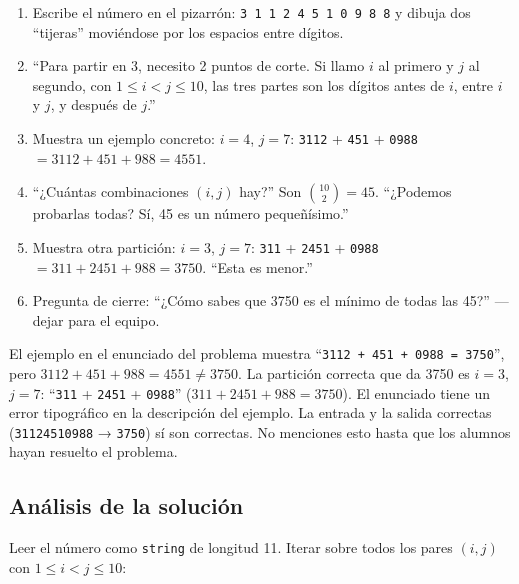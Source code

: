 \documentclass[12pt, oneside]{article}
\begin{document}
\begin{notaprofesor}
  \begin{enumerate}
    \item Escribe el número en el pizarrón:
          \texttt{3\,1\,1\,2\,4\,5\,1\,0\,9\,8\,8}
          y dibuja dos ``tijeras'' moviéndose por los espacios entre
          dígitos.
    \item ``Para partir en 3, necesito 2 puntos de corte.
          Si llamo $i$ al primero y $j$ al segundo, con $1 \le i < j \le 10$,
          las tres partes son los dígitos antes de $i$, entre $i$ y $j$,
          y después de $j$.''
    \item Muestra un ejemplo concreto: $i=4$, $j=7$:
          \texttt{3112} + \texttt{451} + \texttt{0988}
          $= 3112 + 451 + 988 = 4551$.
    \item ``¿Cuántas combinaciones $(i,j)$ hay?''
          Son $\binom{10}{2} = 45$.  ``¿Podemos probarlas todas?
          Sí, 45 es un número pequeñísimo.''
    \item Muestra otra partición: $i=3$, $j=7$:
          \texttt{311} + \texttt{2451} + \texttt{0988}
          $= 311 + 2451 + 988 = 3750$.  ``Esta es menor.''
    \item Pregunta de cierre: ``¿Cómo sabes que 3750 es el mínimo
          de todas las 45?'' — dejar para el equipo.
  \end{enumerate}
\end{notaprofesor}

\begin{notaprofesor}
  El ejemplo en el enunciado del problema muestra
  ``\texttt{3112 + 451 + 0988 = 3750}'', pero
  $3112 + 451 + 988 = 4551 \ne 3750$.
  La partición correcta que da 3750 es $i=3$, $j=7$:
  ``\texttt{311} + \texttt{2451} + \texttt{0988}''
  ($311 + 2451 + 988 = 3750$).
  El enunciado tiene un error tipográfico en la descripción del ejemplo.
  La entrada y la salida correctas (\texttt{31124510988} → \texttt{3750})
  sí son correctas.  No menciones esto hasta que los alumnos hayan
  resuelto el problema.
\end{notaprofesor}

\subsection{Análisis de la solución}

Leer el número como \texttt{string} de longitud 11.
Iterar sobre todos los pares $(i, j)$ con $1 \le i < j \le 10$:
\end{document}
